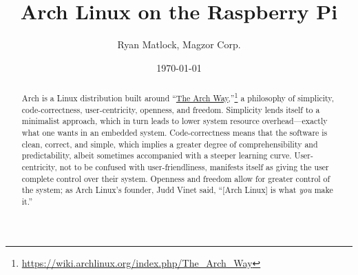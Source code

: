 \documentclass[12pt,letterpaper]{article}
\newcommand\gittext[1]{\texttt{#1}}
\begin{document}
\title{Arch Linux on the Raspberry Pi}
\author{Ryan Matlock, Magzor Corp.}
\date{\today}
\maketitle

\begin{abstract}
Arch is a Linux distribution built around ``\href{https://wiki.archlinux.org/index.php/The_Arch_Way}{The Arch Way},''\footnote{\url{https://wiki.archlinux.org/index.php/The_Arch_Way}} a philosophy of simplicity, code-correctness, user-centricity, openness, and freedom.  Simplicity lends itself to a minimalist approach, which in turn leads to lower system resource overhead---exactly what one wants in an embedded system.  Code-correctness means that the software is clean, correct, and simple, which implies a greater degree of comprehensibility and predictability, albeit sometimes accompanied with a steeper learning curve.  User-centricity, not to be confused with user-friendliness, manifests itself as giving the user complete control over their %
system.  %
Openness and freedom allow for greater control of the system; as Arch Linux's founder, Judd Vinet said, ``[Arch Linux] is what \emph{you} make it.''
\end{abstract}

\tableofcontents

\end{document}
